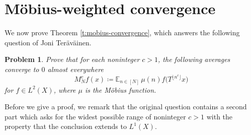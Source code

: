 \documentclass[10pt,leqno]{amsart}
\numberwithin{equation}{section}
\numberwithin{counter2}{section}
\theoremstyle{definition}
\theoremstyle{plain}
\newtheorem{problem}[equation]{Problem}
\begin{document}
		\section{M\"obius-weighted convergence}
We now prove Theorem \ref{t:mobius-convergence}, which answers the following question of Joni Ter\"{a}v\"{a}inen. 
		\begin{problem}
Prove that for each noninteger $c > 1$, the following averages converge to $0$ almost everywhere
\[ M_N^{c} f(x)\coloneqq \mathbb{E}_{n\in[N]} \, \mu(n) f\bigl(T^{\lfloor n^c \rfloor}x\bigr)\]
for $f \in L^2(X)$, where $\mu$ is the M\"{o}bius function.
        \end{problem}
Before we give a proof, we remark that the original question contains a second part which asks for the widest possible range of noninteger $c>1$ with the property that the conclusion extends to $L^1(X).$
\end{document}
